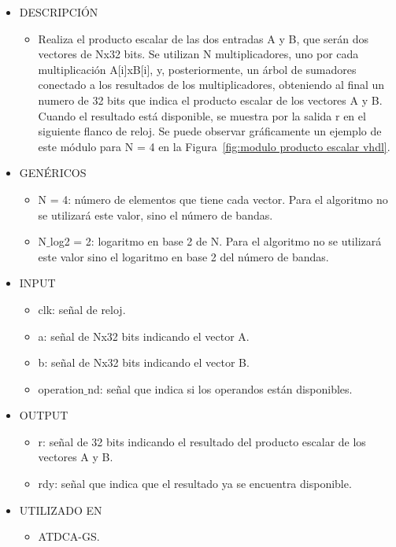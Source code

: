 \begin{itemize}
    \item DESCRIPCIÓN
        \begin{itemize}
            \item Realiza el producto escalar de las dos entradas A y B, que serán dos vectores de Nx32 bits. Se utilizan N multiplicadores, uno por cada multiplicación A[i]xB[i], y, posteriormente, un árbol de sumadores conectado a los resultados de los multiplicadores, obteniendo al final un numero de 32 bits que indica el producto escalar de los vectores A y B. Cuando el resultado está disponible, se muestra por la salida r en el siguiente flanco de reloj. Se puede observar gráficamente un ejemplo de este módulo para N = 4 en la Figura~\ref{fig:modulo producto escalar vhdl}.
        \end{itemize}
    \item GENÉRICOS
        \begin{itemize}
            \item N = 4: número de elementos que tiene cada vector. Para el algoritmo no se utilizará este valor, sino el número de bandas.
            \item N$\_$log2 = 2: logaritmo en base 2 de N. Para el algoritmo no se utilizará este valor sino el logaritmo en base 2 del número de bandas.
        \end{itemize}
    \item INPUT
        \begin{itemize}
            \item clk: señal de reloj.
            \item a: señal de Nx32 bits indicando el vector A.
            \item b: señal de Nx32 bits indicando el vector B.
            \item operation$\_$nd: señal que indica si los operandos están disponibles.
        \end{itemize}
    \item OUTPUT
        \begin{itemize}
            \item r: señal de 32 bits indicando el resultado del producto escalar de los vectores A y B.
            \item rdy: señal que indica que el resultado ya se encuentra disponible.
        \end{itemize}
    \item UTILIZADO EN
        \begin{itemize}
            \item ATDCA-GS.
        \end{itemize}
\end{itemize}

